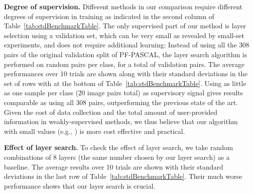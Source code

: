 \documentclass[10pt,twocolumn,letterpaper]{article}
\begin{document}
\smallbreak
\noindent \textbf{Degree of supervision.} 
Different methods in our comparison require different degrees of supervision in training as indicated in the second column of Table~\ref{tab:stdBenchmarkTable}. 
The only supervised part of our method is layer selection using a validation set, which can be very small as revealed by small-set experiments, and does not require additional learning: 
Instead of using all the 308 pairs of the original validation split of PF-PASCAL, 
the layer search algorithm is performed on  random pairs per class, for a total of  validation pairs. 
The average performances over 10 trials are shown along with their standard deviations in the set of rows with  at the bottom of Table~\ref{tab:stdBenchmarkTable}.
Using as little as one sample per class (20 image pairs total) as supervisory signal gives results comparable as using all 308 pairs, outperforming the previous state of the art. 
Given the cost of data collection and the total amount of user-provided information in weakly-supervised methods, we thus believe that our algorithm with small  values (e.g., ) is more cost effective and practical.


\smallbreak
\noindent \textbf{Effect of layer search.} To check the effect of layer search, we take random combinations of 8 layers (the same number chosen by our layer search) as a baseline. 
The average results over 10 trials are shown with their standard deviations in the last row of Table~\ref{tab:stdBenchmarkTable}.
Their much worse performance shows that our layer search is crucial. 
\end{document}
